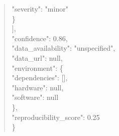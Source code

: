 \documentclass[11pt]{article}
\begin{document}
\begin{quote}
      "severity": "minor"\\
    \}\\
  ],\\
  "confidence": 0.86,\\
  "data\_availability": "unspecified",\\
  "data\_url": null,\\
  "environment": \{\\
    "dependencies": [],\\
    "hardware": null,\\
    "software": null\\
  \},\\
  "reproducibility\_score": 0.25\\
\}\\
\end{quote}
\end{document}
